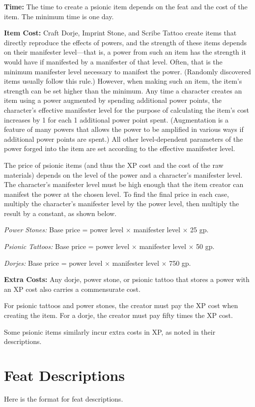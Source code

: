 \textbf{Time:} The time to create a psionic item depends on the feat and the cost of the item. The minimum time is one day.

\textbf{Item Cost:} Craft Dorje, Imprint Stone, and Scribe Tattoo create items that directly reproduce the effects of powers, and the strength of these items depends on their manifester level---that is, a power from such an item has the strength it would have if manifested by a manifester of that level. Often, that is the minimum manifester level necessary to manifest the power. (Randomly discovered items usually follow this rule.) However, when making such an item, the item's strength can be set higher than the minimum. Any time a character creates an item using a power augmented by spending additional power points, the character's effective manifester level for the purpose of calculating the item's cost increases by 1 for each 1 additional power point spent. (Augmentation is a feature of many powers that allows the power to be amplified in various ways if additional power points are spent.) All other level-dependent parameters of the power forged into the item are set according to the effective manifester level.

The price of psionic items (and thus the XP cost and the cost of the raw materials) depends on the level of the power and a character's manifester level. The character's manifester level must be high enough that the item creator can manifest the power at the chosen level. To find the final price in each case, multiply the character's manifester level by the power level, then multiply the result by a constant, as shown below.

\textit{Power Stones:} Base price = power level $\times$ manifester level $\times$ 25 gp.

\textit{Psionic Tattoos:} Base price = power level $\times$ manifester level $\times$ 50 gp.

\textit{Dorjes:} Base price = power level $\times$ manifester level $\times$ 750 gp.

\textbf{Extra Costs:} Any dorje, power stone, or psionic tattoo that stores a power with an XP cost also carries a commensurate cost.

For psionic tattoos and power stones, the creator must pay the XP cost when creating the item. For a dorje, the creator must pay fifty times the XP cost.

Some psionic items similarly incur extra costs in XP, as noted in their descriptions.


\section{Feat Descriptions}
Here is the format for feat descriptions.

